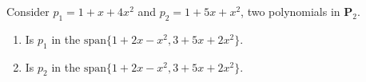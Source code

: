 \documentclass[20pt,a4paper]{extarticle}
\newcounter{example}
\begin{document}
\newpage 

\begin{example}
Consider $p_1 = 1 + x + 4x^2$ and $p_2 = 1 + 5x + x^2$, two polynomials in $\mathbf{P}_2$. 
	\begin{enumerate}[label=\alph*)]
		\item Is $p_1$ in the $\mathrm{span} \{ 1 + 2x - x^2 , 3 + 5x + 2x^2 \}$.
		\item Is $p_2$ in the $\mathrm{span} \{ 1 + 2x - x^2 , 3 + 5x + 2x^2 \}$. 
	\end{enumerate}
\end{example}

\begin{solution}

\end{solution}

\newpage 

\phantom{2} 
\end{document}
